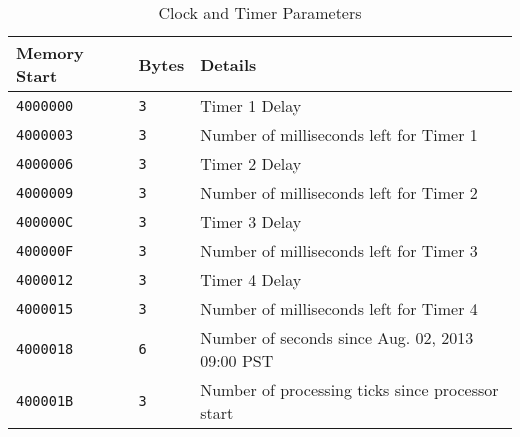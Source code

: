 \begin{table}[H]
\centering
\caption{Clock and Timer Parameters}
\begin{tabu} spread 0pt{ X[-1c]  X[-2c]  X[l] }
Memory Start & Bytes & Details \\
\hline
\texttt{4000000} & \texttt{3} & Timer 1 Delay \\
\texttt{4000003} & \texttt{3} & Number of milliseconds left for Timer 1 \\
\texttt{4000006} & \texttt{3} & Timer 2 Delay \\
\texttt{4000009} & \texttt{3} & Number of milliseconds left for Timer 2 \\
\texttt{400000C} & \texttt{3} & Timer 3 Delay \\
\texttt{400000F} & \texttt{3} & Number of milliseconds left for Timer 3 \\
\texttt{4000012} & \texttt{3} & Timer 4 Delay \\
\texttt{4000015} & \texttt{3} & Number of milliseconds left for Timer 4 \\
\texttt{4000018} & \texttt{6} & Number of seconds since Aug. 02, 2013 09:00 PST \\
\texttt{400001B} & \texttt{3} & Number of processing ticks since processor start \\
\end{tabu}
\end{table}